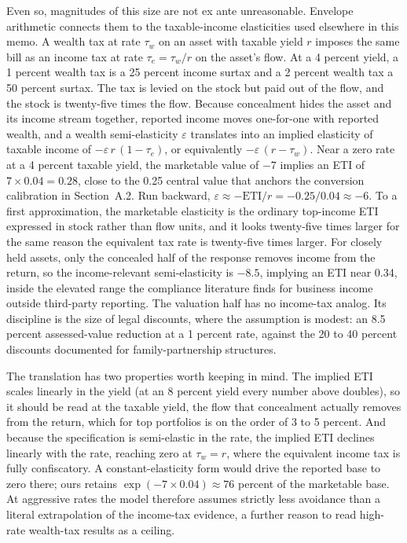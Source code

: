 \documentclass[10pt,twocolumn]{article}
\begin{document}
Even so, magnitudes of this size are not ex ante unreasonable. Envelope
arithmetic connects them to the taxable-income elasticities used elsewhere in
this memo. A wealth tax at rate $\tau_w$ on an asset with taxable yield $r$
imposes the same bill as an income tax at rate $\tau_e = \tau_w / r$ on the
asset's flow. At a 4 percent yield, a 1 percent wealth tax is a 25 percent
income surtax and a 2 percent wealth tax a 50 percent surtax. The tax is
levied on the stock but paid out of the flow, and the stock is twenty-five
times the flow. Because concealment hides the asset and its income stream
together, reported income moves one-for-one with reported wealth, and a wealth
semi-elasticity $\varepsilon$ translates into an implied elasticity of taxable
income of $-\varepsilon\, r\,(1-\tau_e)$, or equivalently $-\varepsilon\,(r -
\tau_w)$. Near a zero rate at a 4 percent taxable yield, the marketable value
of $-7$ implies an ETI of $7 \times 0.04 = 0.28$, close to the 0.25 central
value that anchors the conversion calibration in Section~A.2. Run backward,
$\varepsilon \approx -\text{ETI}/r = -0.25/0.04 \approx -6$. To a first
approximation, the marketable elasticity is the ordinary top-income ETI
expressed in stock rather than flow units, and it looks twenty-five times
larger for the same reason the equivalent tax rate is twenty-five times
larger. For closely held assets, only the concealed half of the response
removes income from the return, so the income-relevant semi-elasticity is
$-8.5$, implying an ETI near 0.34, inside the elevated range the compliance
literature finds for business income outside third-party reporting. The
valuation half has no income-tax analog. Its discipline is the size of legal
discounts, where the assumption is modest: an 8.5 percent assessed-value
reduction at a 1 percent rate, against the 20 to 40 percent discounts
documented for family-partnership structures.

The translation has two properties worth keeping in mind. The implied ETI
scales linearly in the yield (at an 8 percent yield every number above
doubles), so it should be read at the taxable yield, the flow that concealment
actually removes from the return, which for top portfolios is on the order of
3 to 5 percent. And because the specification is semi-elastic in the rate, the
implied ETI declines linearly with the rate, reaching zero at $\tau_w = r$,
where the equivalent income tax is fully confiscatory. A constant-elasticity
form would drive the reported base to zero there; ours retains $\exp(-7 \times
0.04) \approx 76$ percent of the marketable base. At aggressive rates the
model therefore assumes strictly less avoidance than a literal extrapolation
of the income-tax evidence, a further reason to read high-rate wealth-tax
results as a ceiling.
\end{document}
